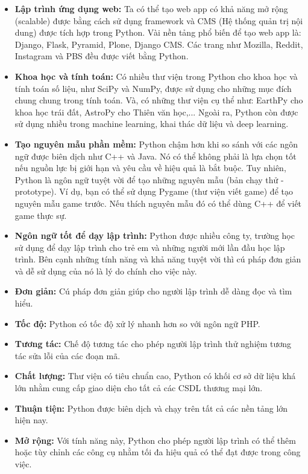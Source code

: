 \begin{itemize}
    \item \textbf{Lập trình ứng dụng web:} Ta có thể tạo web app có khả năng mở rộng (scalable) được bằng cách sử dụng framework và CMS (Hệ thống quản trị nội dung) được tích hợp trong Python. Vài nền tảng phổ biến để tạo web app là:  Django, Flask, Pyramid, Plone, Django CMS. Các trang như Mozilla, Reddit, Instagram và PBS đều được viết bằng Python.
    \item \textbf{Khoa học và tính toán:} Có nhiều thư viện trong Python cho khoa học và tính toán số liệu, như SciPy và NumPy, được sử dụng cho những mục đích chung chung trong tính toán. Và, có những thư viện cụ thể như: EarthPy cho khoa học trái đất, AstroPy cho Thiên văn học,... Ngoài ra, Python còn được sử dụng nhiều trong machine learning, khai thác dữ liệu và deep learning.
    \item \textbf{Tạo nguyên mẫu phần mềm:} Python chậm hơn khi so sánh với các ngôn ngữ được biên dịch như C++ và Java. Nó có thể không phải là lựa chọn tốt nếu nguồn lực bị giới hạn và yêu cầu về hiệu quả là bắt buộc. Tuy nhiên, Python là ngôn ngữ tuyệt vời để tạo những nguyên mẫu (bản chạy thử - prototype). Ví dụ, bạn có thể sử dụng Pygame (thư viện viết game) để tạo nguyên mẫu game trước. Nếu thích nguyên mẫu đó có thể dùng C++ để viết game thực sự.
    \item \textbf{Ngôn ngữ tốt để dạy lập trình:} Python được nhiều công ty, trường học sử dụng để dạy lập trình cho trẻ em và những người mới lần đầu học lập trình. Bên cạnh những tính năng và khả năng tuyệt vời thì cú pháp đơn giản và dễ sử dụng của nó là lý do chính cho việc này.
\end{itemize}
\begin{itemize}
  \item \textbf{Đơn giản:} Cú pháp đơn giản giúp cho người lập trình dễ dàng đọc và tìm hiểu.
  \item \textbf{Tốc độ:} Python có tốc độ xử lý nhanh hơn so với ngôn ngữ PHP.
  \item \textbf{Tương tác:} Chế độ tương tác cho phép người lập trình thử nghiệm tương tác sửa lỗi của các đoạn mã.
  \item \textbf{Chất lượng:} Thư viện có tiêu chuẩn cao, Python có khối cơ sở dữ liệu khá lớn nhằm cung cấp giao diện cho tất cả các CSDL thương mại lớn.
  \item \textbf{Thuận tiện:} Python được biên dịch và chạy trên tất cả các nền tảng lớn hiện nay.
  \item \textbf{Mở rộng:} Với tính năng này, Python cho phép người lập trình có thể thêm hoặc tùy chỉnh các công cụ nhằm tối đa hiệu quả có thể đạt được trong công việc.
\end{itemize}
